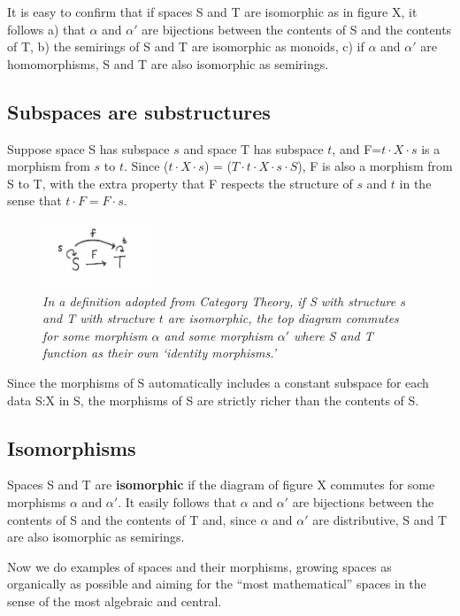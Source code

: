 \documentclass[11pt]{article}
\begin{document}
It is easy to confirm that if spaces S and T are isomorphic as in figure X, it follows a) that $\alpha$ and $\alpha'$ are bijections between the contents of S and the contents of T, b) the semirings of 
S and T are isomorphic as monoids, c) if $\alpha$ and $\alpha'$ are homomorphisms, S and T are also isomorphic as semirings.

\subsection{Subspaces are substructures} 

Suppose space S has subspace $s$ and space T has subspace $t$, and F=$t\cdot X\cdot s$ is a morphism from $s$ to $t$.   Since ($t\cdot X\cdot s$) = ($T\cdot t \cdot X\cdot s\cdot S$), 
F is also a morphism from S to T, with the extra property that F respects the structure of $s$ and $t$ in the sense that $t\cdot F=F\cdot s$.

\begin{figure}[h]
\centering
\includegraphics[width=0.3\textwidth]{structure.pdf}
\caption{{\it In a definition adopted from Category Theory, if S with structure $s$ and T with structure $t$ are isomorphic, the top diagram commutes for some morphism $\alpha$ and some morphism $\alpha'$ where S and T function as their own `identity morphisms.' }}
\end{figure}

Since the morphisms of S automatically includes a constant subspace for each data S:X in S, the morphisms of S are strictly richer than the contents of S.  

\subsection{Isomorphisms} 

Spaces S and T are {\bf isomorphic} if the diagram of figure X commutes for some morphisms $\alpha$ and $\alpha'$.  It easily follows that $\alpha$ and $\alpha'$ are bijections between the contents of S and the contents of T and, since $\alpha$ and $\alpha'$ are distributive, S and T are also isomorphic as semirings.



Now we do examples of spaces and their morphisms, growing spaces as organically as possible and aiming for the ``most mathematical'' spaces in the sense of the most algebraic and central.
\end{document}
